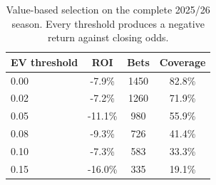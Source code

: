 \begin{table}[tbp]
\centering
\small
\setlength{\tabcolsep}{5pt}
\caption{Value-based selection on the complete 2025/26 season. Every threshold produces a negative return against closing odds.}
\label{tab:value}
\begin{tabular}{lccc}
\toprule
EV threshold & ROI & Bets & Coverage \\
\midrule
0.00 & -7.9\% & 1450 & 82.8\% \\
0.02 & -7.2\% & 1260 & 71.9\% \\
0.05 & -11.1\% & 980 & 55.9\% \\
0.08 & -9.3\% & 726 & 41.4\% \\
0.10 & -7.3\% & 583 & 33.3\% \\
0.15 & -16.0\% & 335 & 19.1\% \\
\bottomrule
\end{tabular}
\end{table}
